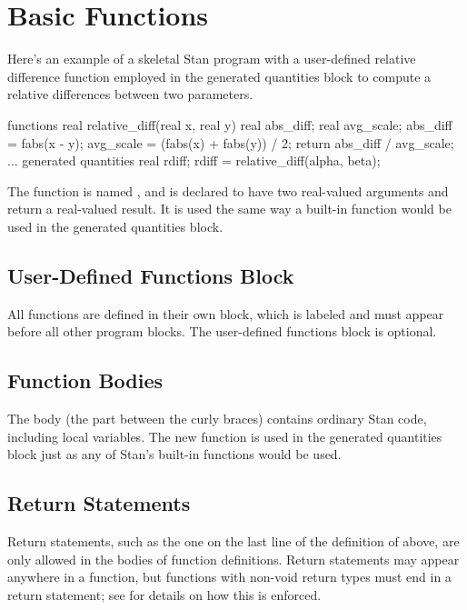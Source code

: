 \section{Basic Functions}\label{basic-functions.section}

Here's an example of a skeletal Stan program with a user-defined
relative difference function employed in the generated quantities
block to compute a relative differences between two parameters.
%
\begin{stancode}
functions {
  real relative_diff(real x, real y) {
    real abs_diff;
    real avg_scale;
    abs_diff = fabs(x - y);
    avg_scale = (fabs(x) + fabs(y)) / 2;
    return abs_diff / avg_scale;
  }
}
...
generated quantities {
  real rdiff;
  rdiff = relative_diff(alpha, beta);
}
\end{stancode}
%
The function is named , and is declared to have
two real-valued arguments and return a real-valued result.   It is
used the same way a built-in function would be used in the generated
quantities block.

\subsection{User-Defined Functions Block}

All functions are defined in their own block, which is labeled
 and must appear before all other program blocks.  The
user-defined functions block is optional.

\subsection{Function Bodies}

The body (the part between the curly braces) contains ordinary Stan
code, including local variables.  The new function is used in the
generated quantities block just as any of Stan's built-in functions
would be used.

\subsection{Return Statements}

Return statements, such as the one on the last line of the definition
of  above, are only allowed in the bodies of
function definitions.  Return statements may appear anywhere in a
function, but functions with non-void return types must end in a
return statement; see  for details on how
this is enforced.

